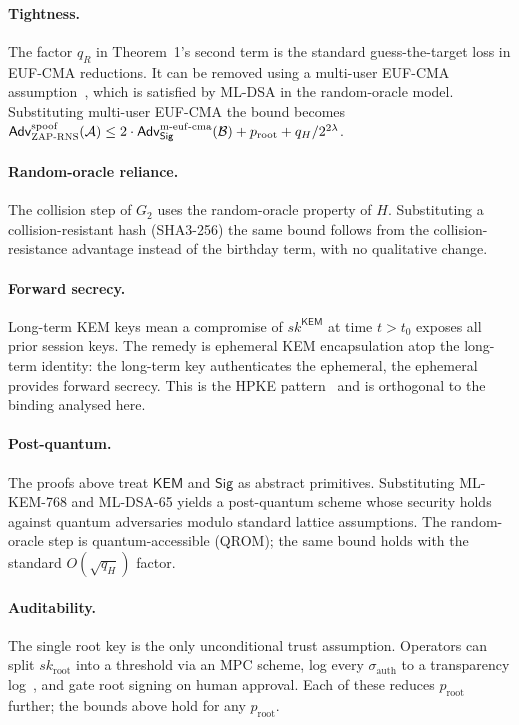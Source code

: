 \documentclass[11pt,a4paper]{article}
\theoremstyle{definition}
\theoremstyle{remark}
\newcommand{\KEM}{\mathsf{KEM}}
\newcommand{\Sig}{\mathsf{Sig}}
\newcommand{\Adv}{\mathsf{Adv}}
\newcommand{\sk}{\mathit{sk}}
\newcommand{\RNS}{\textsc{ZAP-RNS}}
\begin{document}
\paragraph{Tightness.} The factor $q_R$ in Theorem~1's second term is
the standard guess-the-target loss in EUF-CMA reductions. It can be
removed using a multi-user EUF-CMA assumption~\cite{boneh2001ibe},
which is satisfied by ML-DSA in the random-oracle model. Substituting
multi-user EUF-CMA the bound becomes
$\Adv^{\mathrm{spoof}}_{\RNS}(\mathcal{A}) \le 2 \cdot
\Adv^{\mathrm{m\text{-}euf\text{-}cma}}_{\Sig}(\mathcal{B}) +
p_{\mathrm{root}} + q_H/2^{2\lambda}$.

\paragraph{Random-oracle reliance.} The collision step of $G_2$ uses
the random-oracle property of $H$. Substituting a collision-resistant
hash (SHA3-256) the same bound follows from the collision-resistance
advantage instead of the birthday term, with no qualitative change.

\paragraph{Forward secrecy.} Long-term KEM keys mean a compromise of
$\sk^\KEM$ at time $t > t_0$ exposes all prior session keys. The
remedy is ephemeral KEM encapsulation atop the long-term identity:
the long-term key authenticates the ephemeral, the ephemeral provides
forward secrecy. This is the HPKE pattern~\cite{rfc9180} and is
orthogonal to the binding analysed here.

\paragraph{Post-quantum.} The proofs above treat $\KEM$ and $\Sig$ as
abstract primitives. Substituting ML-KEM-768 and ML-DSA-65 yields a
post-quantum scheme whose security holds against quantum adversaries
modulo standard lattice assumptions. The random-oracle step is
quantum-accessible (QROM); the same bound holds with the standard
$O(\sqrt{q_H})$ factor.

\paragraph{Auditability.} The single root key is the only unconditional
trust assumption. Operators can split $\sk_{\mathrm{root}}$ into a
threshold via an MPC scheme, log every $\sigma_{\mathrm{auth}}$ to a
transparency log~\cite{certtransparency}, and gate root signing on
human approval. Each of these reduces $p_{\mathrm{root}}$ further; the
bounds above hold for any $p_{\mathrm{root}}$.
\end{document}
